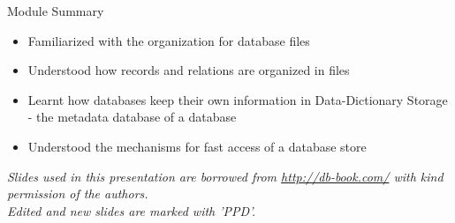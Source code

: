 \documentclass[aspectratio=169, xcolor=dvipsnames]{beamer}
\begin{document}
\begin{frame}{Module Summary}
    \begin{block}{}
        \begin{itemize}
            \item Familiarized with the organization for database files
            \item Understood how records and relations are organized in files
            \item Learnt how databases keep their own information in Data-Dictionary Storage - the metadata database of a database
            \item Understood the mechanisms for fast access of a database store
        \end{itemize}
    \end{block}
    \vspace{2em}
    \begin{center}
        \small \textit{Slides used in this presentation are borrowed from \url{http://db-book.com/} with kind permission of the authors.} \\
        \small \textit{Edited and new slides are marked with 'PPD'.}
    \end{center}
\end{frame}
\end{document}
